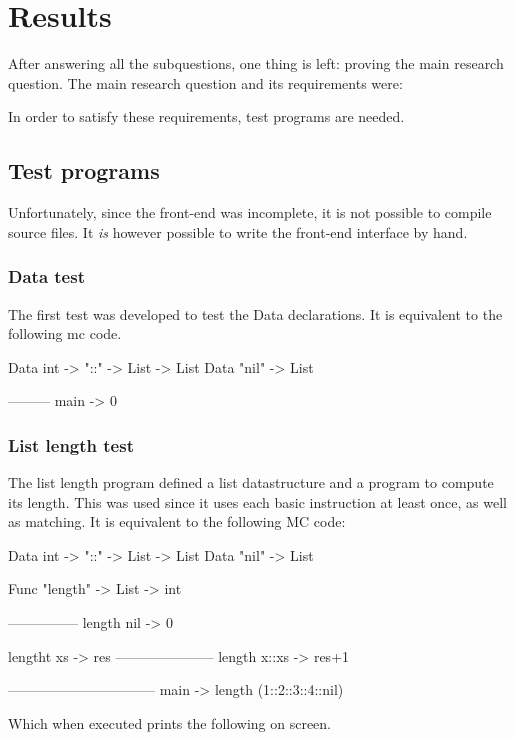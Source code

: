 \section{Results}
After answering all the subquestions, one thing is left: proving the main research question.
The main research question and its requirements were:



In order to satisfy these requirements, test programs are needed.

\subsection{Test programs}
Unfortunately, since the front-end was incomplete, it is not possible to compile source files.
It \textit{is} however possible to write the front-end interface by hand.

\subsubsection{Data test}
The first test was developed to test the Data declarations.
It is equivalent to the following mc code.

\begin{MC}
Data int -> "::" -> List -> List
Data "nil" -> List

---------
main -> 0
\end{MC}

\subsubsection{List length test}
The list length program defined a list datastructure and a program to compute its length.
This was used since it uses each basic instruction at least once, as well as matching.
It is equivalent to the following MC code:

\begin{MC}
Data int -> "::" -> List -> List
Data "nil" -> List

Func "length" -> List -> int

---------------
length nil -> 0

lengtht xs -> res
---------------------
length x::xs -> res+1

--------------------------------
main -> length (1::2::3::4::nil)
\end{MC}

Which when executed prints the following on screen.

